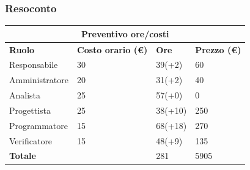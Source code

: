 \documentclass[10pt]{article}
\begin{document}
\subsubsection{Resoconto}
\begin{center}
	\begin{tabularx}{\textwidth}{|X|X|X|X|}
		\hline
		\multicolumn{4}{|c|}{\textbf{Preventivo ore/costi}}                                      \\
		\hline
		\hline
		\textbf{Ruolo}  & \textbf{Costo orario (\euro)} & \textbf{Ore} & \textbf{Prezzo (\euro)} \\
		\hline
		Responsabile    & 30                            & 39(+2)       & 60                      \\
		\hline
		Amministratore  & 20                            & 31(+2)       & 40                      \\
		\hline
		Analista        & 25                            & 57(+0)       & 0                       \\
		\hline
		Progettista     & 25                            & 38(+10)       & 250                     \\
		\hline
		Programmatore   & 15                            & 68(+18)       & 270                     \\
		\hline
		Verificatore    & 15                            & 48(+9)       & 135                      \\
		\hline
		\hline
		\textbf{Totale} &                               & 281          & 5905                    \\
		\hline
	\end{tabularx}\\[8pt]
	\mbox{}\\
\end{center}
\end{document}
